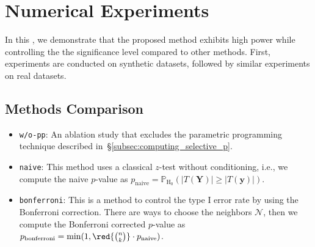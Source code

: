 
\section{Numerical Experiments}
\label{sec:experiments}
%
In this , we demonstrate that the proposed method exhibits high power  while controlling the  the significance level compared to other methods. 
%
First, experiments are conducted on synthetic datasets, followed by similar experiments on  real datasets.
%

\subsection{Methods Comparison}
\label{sec:methods}
%
%

\begin{itemize}
  \item \texttt{w/o-pp}: An ablation study that excludes the parametric programming technique described in~\S\ref{subsec:computing_selective_p}. 
  \item \texttt{naive}: This method uses a classical $z$-test without conditioning, i.e., we compute the naive $p$-value as $p_\mathrm{naive} = \mathbb{P}_{\mathrm{H}_0}(|T(\bm{Y})| \geq |T(\bm{y})|)$.
  \item \texttt{bonferroni}: This is a method to control the type I error rate by using the Bonferroni correction. There are  ways to choose the neighbors $\mathcal{N}$, then we compute the Bonferroni corrected $p$-value as $p_\mathrm{bonferroni} = \min(1, \red{\tbinom{n}{k}} \cdot p_\mathrm{naive})$.
\end{itemize}




